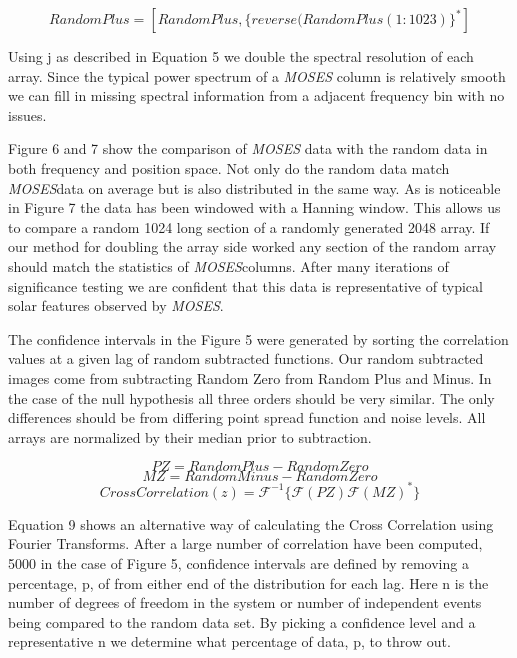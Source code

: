 \documentclass[]{aastex6}
\newcommand{\MOSES}{\textit{MOSES}}
\begin{document}
\begin{equation}
Random Plus = [Random Plus,\lbrace reverse(Random Plus(1:1023)\rbrace^*] 
\end{equation}

Using j as described in Equation 5 we double the spectral resolution of each array.  Since the typical power spectrum of a \textit{MOSES} column is relatively smooth we can fill in missing spectral information from a adjacent frequency bin with no issues.  

Figure 6 and 7 show the comparison of \textit{MOSES} data with the random data in both frequency and position space.  Not only do the random data match \MOSES data on average but is also distributed in the same way.  As is noticeable in Figure 7 the data has been windowed with a Hanning window.  This allows us to compare a random 1024 long section of a randomly generated 2048 array. If our method for doubling the array side worked any section of the random array should match the statistics of \MOSES columns. After many iterations of significance testing we are confident that this data is representative of typical solar features observed by \textit{MOSES}.

The confidence intervals in the Figure 5 were generated by sorting the correlation values at a given lag of random subtracted functions.  Our random subtracted images come from subtracting Random Zero from Random Plus and Minus. In the case of the null hypothesis all three orders should be very similar.  The only differences should be from differing point spread function and noise levels.  All arrays are normalized by their median prior to subtraction.

\begin{equation}
PZ =  RandomPlus - RandomZero
\end{equation}
\begin{equation*}
MZ = RandomMinus - RandomZero
\end{equation*}
\begin{equation}
CrossCorrelation (z) = \mathcal{F}^{-1} \lbrace \mathcal{F}(PZ) \mathcal{F}(MZ)^* \rbrace
\end{equation}

Equation 9 shows an alternative way of calculating the Cross Correlation using Fourier Transforms. After a large number of correlation have been computed, 5000 in the case of Figure 5, confidence intervals are defined by removing a percentage, p, of from either end of the distribution for each lag. Here n is the number of degrees of freedom in the system or number of independent events being compared to the random data set.  By picking a confidence level and a representative n we determine what percentage of data, p, to throw out.
\end{document}
